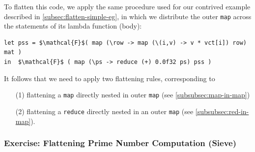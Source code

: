 \documentclass[acmsmall,review]{acmart}\settopmatter{printfolios=true,printccs=false,printacmref=false}
\begin{document}
To flatten this code, we apply the same procedure used for our contrived
example described in \cref{subsec:flatten-simple-eg}, in which we distribute
the outer \lstinline{map} across the statements of its lambda function (body):
\begin{lstlisting}[mathescape=true]
let pss = $\mathcal{F}$( map (\row -> map (\(i,v) -> v * vct[i]) row) mat )
in  $\mathcal{F}$ ( map (\ps -> reduce (+) 0.0f32 ps) pss )
\end{lstlisting}\vspace{-2ex}
It follows that we need to apply two flattening rules, corresponding to
\begin{itemize}
    \item[(1)] flattening a \lstinline{map} directly nested in outer 
                \lstinline{map} (see \cref{subsubsec:map-in-map})
    \item[(2)] flattening a \lstinline{reduce} directly nested in an
                outer \lstinline{map} (see \cref{subsubsec:red-in-map}).
\end{itemize}

\subsubsection{Exercise: Flattening Prime Number Computation (Sieve)}
\label{exercise:flat-primes}
$\mbox{ }$\\
\end{document}
